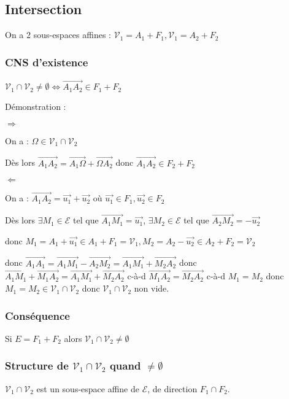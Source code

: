 \documentclass[12pt,a4paper,french]{book}
\begin{document}
		\subsection{Intersection}
			On a 2 sous-espaces affines : $\mathcal{V}_1  = A_1 + F_1, \mathcal{V}_1  = A_2 + F_2 $
			\subsubsection{CNS d'existence}
				 $\mathcal{V}_1 \cap\mathcal{V}_2 \neq\emptyset \Leftrightarrow \overrightarrow{A_1 A_2} \in F_1 + F_2$
				 
				 Démonstration : 
				 
				 $\Rightarrow$
				 
				 On a : $\Omega \in \mathcal{V}_1 \cap\mathcal{V}_2$
				 
				 Dès lors $\overrightarrow{A_1 A_2} = \overrightarrow{A_1 \Omega} + \overrightarrow{\Omega A_2}$ donc $\overrightarrow{A_1 A_2} \in F_2 + F_2$
				 
				 $\Leftarrow$
				 
				 On a : $\overrightarrow{A_1 A_2} = \overrightarrow{u_1} +\overrightarrow{u_2}$ où $ \overrightarrow{u_1} \in F_1, \overrightarrow{u_2} \in F_2$
				 
				 Dès lors $\exists M_1 \in \mathcal{E}$ tel que  $\overrightarrow{A_1M_1} = \overrightarrow{u_1}$, $\exists M_2 \in \mathcal{E}$ tel que $\overrightarrow{A_2M_2} = -\overrightarrow{u_2}$
				 
				 donc $M_1 = A_1 + \overrightarrow{u_1} \in A_1 + F_1 = \mathcal{V}_1, M_2 = A_2 - \overrightarrow{u_2} \in A_2 + F_2 = \mathcal{V}_2$
				 
				 donc $\overrightarrow{A_1 A_1} = \overrightarrow{A_1M_1} - \overrightarrow{A_2M_2} = \overrightarrow{A_1M_1} +\overrightarrow{M_2A_2}$ donc $\overrightarrow{A_1M_1} + \overrightarrow{M_1A_2} = \overrightarrow{A_1M_1} +\overrightarrow{M_2A_2}$ c-à-d $\overrightarrow{M_1A_2} = \overrightarrow{M_2A_2}$ c-à-d $M_1 = M_2$ donc $M_1 = M_2 \in \mathcal{V}_1 \cap \mathcal{V}_2$ donc $\mathcal{V}_1 \cap \mathcal{V}_2$ non vide.
			
			\subsubsection{Conséquence}
				Si $E = F_1 + F_2$ alors $\mathcal{V}_1 \cap\mathcal{V}_2 \neq\emptyset$
			\subsubsection{Structure de $\mathcal{V}_1 \cap\mathcal{V}_2$ quand $\neq\emptyset$}
				 $\mathcal{V}_1 \cap\mathcal{V}_2$ est un sous-espace affine de $\mathcal{E}$, de direction $F_1 \cap F_2$.
				 
\end{document}
